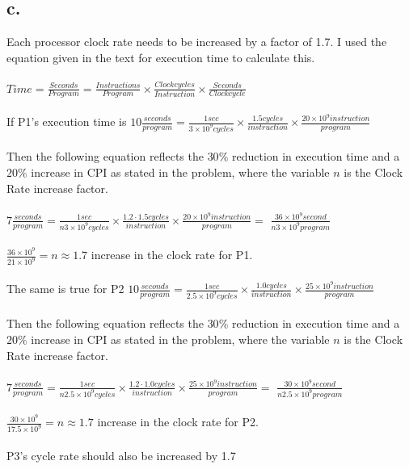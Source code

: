 \documentclass[12pt,letterpaper]{article}
\begin{document}
\subsection*{c.}
Each processor clock rate needs to be increased by a factor of 1.7. I used the equation given in the text for execution time to calculate this.\\\\
$Time = \frac{Seconds}{Program} = \frac{Instructions}{Program} \times \frac{Clock cycles}{Instruction} \times \frac{Seconds}{Clock cycle}$\\\\
If P1's execution time is $10 \frac{seconds}{program} = \frac{1 sec}{3\times10^9 cycles} \times \frac{1.5 cycles}{instruction} \times \frac{20 \times 10^9 instruction}{program}$\\\\
Then the following equation reflects the $30\%$ reduction in execution time and a $20\%$ increase in CPI as stated in the problem, where the variable $n$ is the Clock Rate increase factor.\\\\
$7 \frac{seconds}{program} = \frac{1 sec}{n3\times10^9 cycles} \times \frac{1.2 \cdot 1.5 cycles}{instruction} \times \frac{20 \times 10^9 instruction}{program} = $
$\frac{36 \times 10^{9} second}{n3\times 10^{9} program}$\\\\
$\frac{36 \times 10^{9}}{21 \times 10^{9}} = n \approx 1.7$ increase in the clock rate for P1.\\\\
The same is true for P2 $10 \frac{seconds}{program} = \frac{1 sec}{2.5\times10^9 cycles} \times \frac{1.0 cycles}{instruction} \times \frac{25 \times 10^9 instruction}{program}$\\\\
Then the following equation reflects the $30\%$ reduction in execution time and a $20\%$ increase in CPI as stated in the problem, where the variable $n$ is the Clock Rate increase factor.\\\\
$7 \frac{seconds}{program} = \frac{1 sec}{n2.5\times10^9 cycles} \times \frac{1.2 \cdot 1.0 cycles}{instruction} \times \frac{25 \times 10^9 instruction}{program} = $
$\frac{30 \times 10^{9} second}{n2.5\times 10^{9} program}$\\\\
$\frac{30 \times 10^{9}}{17.5 \times 10^{9}} = n \approx 1.7$ increase in the clock rate for P2.\\\\
P3's cycle rate should also be increased by 1.7
\end{document}
